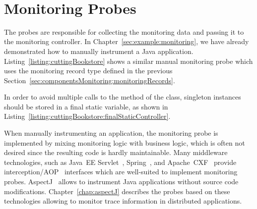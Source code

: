 \pagebreak 

\ %

\setJavaCodeListing



\section{Monitoring Probes}\label{sec:monitoring:probe}

The probes are responsible for collecting the monitoring data and passing it %
to the monitoring controller. %
In Chapter~\ref{sec:example:monitoring}, we have already demonstrated how to %
manually instrument a Java application. Listing~\ref{listing:cuttingBookstore} %
shows a similar manual monitoring probe which uses the monitoring record type %
 defined in the previous Section~\ref{sec:componentsMonitoring:monitoringRecords}.



\noindent In order to avoid multiple calls to the  method of the %
 class, singleton instances should be stored %
in a final static variable, as shown in Listing~\ref{listing:cuttingBookstore:finalStaticController}.



\noindent When manually instrumenting an application, the monitoring probe is implemented %
by mixing monitoring logic with business logic, which is often not desired since %
the resulting code is hardly maintainable. %
Many middleware technologies, such as Java~EE Servlet~\cite{JavaServletTechnology-WebSite}, %
Spring~\cite{Spring-WebSite}, and %
Apache~CXF~\cite{CXF-WebSite} provide interception/AOP~\cite{Kiczales1997} interfaces %
which are well-suited to implement monitoring probes. AspectJ~\cite{AspectJ-WebSite} allows to %
instrument Java applications without source code modifications. %
Chapter~\ref{chap:aspectJ} describes the \Kieker{} probes based on these technologies allowing to %
monitor trace information in distributed applications.

